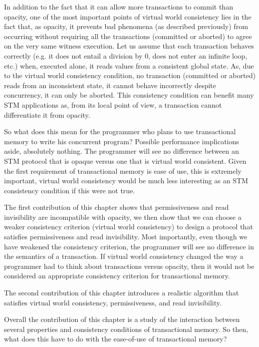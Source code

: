 \documentclass[runningheads,a4paper]{article}
\begin{document}
In addition to the fact that  it can allow more transactions to commit than
opacity,  one of  the most important points  of virtual world  consistency lies 
in   the fact that,  as opacity, it  prevents  bad  phenomena  (as described 
previously)    from occurring  without requiring  all the
transactions  (committed   or  aborted)  to  agree on the very same  witness
execution.  Let  us  assume  that each  transaction  behaves  correctly
(e.g. it does not entail a division  by 0, does not enter an infinite loop,
etc.) when, executed  alone, it  reads  values from  a consistent  global
state.  As, due  to the virtual world consistency  condition, no transaction
(committed or aborted)  reads from an inconsistent state,  it cannot behave
incorrectly despite  concurrency, it can only  be aborted.
This  consistency 
condition  can benefit many  STM applications as, from  its  local point
of view,  a transaction cannot  differentiate it from opacity.

So what does this mean for the programmer who plans to use transactional memory
to write his concurrent program?
Possible performance implications aside, absolutely nothing.
The programmer will see no difference between an STM protocol that is opaque
versus one that is virtual world consistent.
Given the first requirement of transactional memory is ease of use, this is extremely
important, virtual world consistency would be much less interesting as an STM
consistency condition if this were not true.


The first contribution of this chapter shows that permissiveness and read invisibility are
incompatible with opacity, we then show that we can choose a weaker consistency criterion
(virtual world consistency) to design a protocol that satisfies permissiveness and
read invisibility.
Most importantly, even though we have weakened the consistency criterion, the programmer
will see no difference in the semantics of a transaction.
If virtual world consistency changed the way a programmer had to think about transactions versus opacity,
then it would not be considered an appropriate consistency criterion for transactional memory.

The second contribution of this chapter introduces a realistic algorithm that satisfies
virtual world consistency, permissiveness, and read invisibility.


Overall the contribution of this chapter is a study of the interaction
between several properties and consistency conditions of transactional memory.
So then, what does this have to do with the ease-of-use of 
transactional memory?
\end{document}

